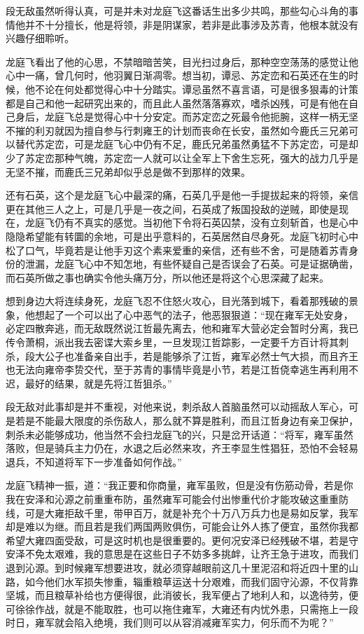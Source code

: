 段无敌虽然听得认真，可是并未对龙庭飞这番话生出多少共鸣，那些勾心斗角的事情他并不十分擅长，他是将领，非是阴谋家，若非是此事涉及苏青，他根本就没有兴趣仔细聆听。

龙庭飞看出了他的心思，不禁暗暗苦笑，目光扫过身后，那种空空荡荡的感觉让他心中一痛，曾几何时，他羽翼日渐凋零。想当初，谭忌、苏定峦和石英还在生的时候，他不论在何处都觉得心中十分踏实。谭忌虽然不喜言语，可是很多狠毒的计策都是自己和他一起研究出来的，而且此人虽然落落寡欢，嗜杀凶残，可是有他在自己身后，龙庭飞总是觉得心中十分安定。而苏定峦之死最令他扼腕，这样一柄无坚不摧的利刃就因为擅自参与行刺雍王的计划而丧命在长安，虽然如今鹿氏三兄弟可以替代苏定峦，可是龙庭飞心中仍有不足，鹿氏兄弟虽然勇猛不下苏定峦，可是却少了苏定峦那种气魄，苏定峦一人就可以让全军上下舍生忘死，强大的战力几乎是无坚不摧，而鹿氏三兄弟却似乎总是做不到那样的效果。

还有石英，这个是龙庭飞心中最深的痛，石英几乎是他一手提拔起来的将领，亲信更在其他三人之上，可是几乎是一夜之间，石英成了叛国投敌的逆贼，即使是现在，龙庭飞仍有不真实的感觉。当初他下令将石英囚禁，没有立刻斩首，也是心中隐隐希望能有转圜的余地，可是出乎意料的，石英居然自尽身死。龙庭飞初时心中松了口气，毕竟若是让他手刃这个素来爱重的亲信，还有些不舍，可是随着苏青身份的泄漏，龙庭飞心中不知怎地，有些怀疑自己是否误会了石英。可是证据确凿，而石英所做之事也确实令他头痛万分，所以他还是将这个心思深藏了起来。

想到身边大将连续身死，龙庭飞忍不住怒火攻心，目光落到城下，看着那残破的景象，他想起了一个可以出了心中恶气的法子，他恶狠狠道：“现在雍军无处安身，必定四散奔逃，而无敌既然说江哲最先离去，他和雍军大营必定会暂时分离，我已传令萧桐，派出我去密谍大索乡里，一旦发现江哲踪影，一定要千方百计将其刺杀，段大公子也准备亲自出手，若是能够杀了江哲，雍军必然士气大损，而且齐王也无法向雍帝李贽交代，至于苏青的事情毕竟是小节，若是江哲侥幸逃生再利用不迟，最好的结果，就是先将江哲狙杀。”

段无敌对此事却是并不重视，对他来说，刺杀敌人首脑虽然可以动摇敌人军心，可是若是不能最大限度的杀伤敌人，那么就不算是胜利，而且江哲身边有亲卫保护，刺杀未必能够成功，他当然不会扫龙庭飞的兴，只是岔开话道：“将军，雍军虽然落败，但是骑兵主力仍在，水退之后必然来攻，齐王李显生性猖狂，恐怕不会轻易退兵，不知道将军下一步准备如何作战。”

龙庭飞精神一振，道：“我正要和你商量，雍军虽败，但是没有伤筋动骨，若是你我在安泽和沁源之前重重布防，虽然雍军可能会付出惨重代价才能攻破这重重防线，可是大雍拒敌千里，带甲百万，就是补充个十万八万兵力也是易如反掌，我军却是难以为继。而且若是我们两国两败俱伤，可能会让外人拣了便宜，虽然你我都希望大雍四面受敌，可是这时机也是很重要的。更何况安泽已经残破不堪，若是守安泽不免太艰难，我的意思是在这些日子不妨多多挑衅，让齐王急于进攻，而我们退到沁源。到时候雍军想要进攻，就必须穿越眼前这几十里泥沼和将近四十里的山路，如今他们水军损失惨重，辎重粮草运送十分艰难，而我们固守沁源，不仅背靠坚城，而且粮草补给也方便得很，此消彼长，我军便占了地利人和，以逸待劳，便可徐徐作战，就是不能取胜，也可以拖住雍军，大雍还有内忧外患，只需拖上一段时日，雍军就会陷入绝境，我们则可以从容消减雍军实力，何乐而不为呢？”

